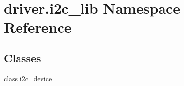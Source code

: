 \hypertarget{namespacedriver_1_1i2c__lib}{}\section{driver.\+i2c\+\_\+lib Namespace Reference}
\label{namespacedriver_1_1i2c__lib}
\subsection*{Classes}
\begin{DoxyCompactItemize}
\item 
class \hyperlink{classdriver_1_1i2c__lib_1_1i2c__device}{i2c\+\_\+device}
\end{DoxyCompactItemize}
